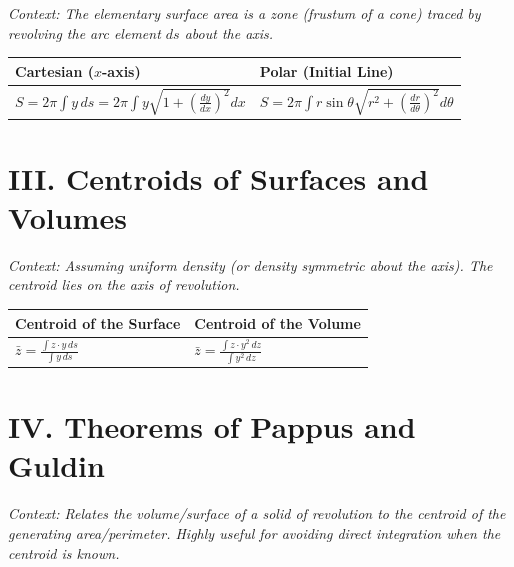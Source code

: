 \documentclass[11pt, a4paper]{article}
\begin{document}
\textit{\small Context: The elementary surface area is a zone (frustum of a cone) traced by revolving the arc element $ds$ about the axis.}

\begin{center}
\begin{tabular}{@{}p{} p{}@{}}
\toprule
\textbf{Cartesian ($x$-axis)} & \textbf{Polar (Initial Line)} \\
\midrule
$S = 2\pi \int y \, ds = 2\pi \int y \sqrt{1 + \left(\frac{dy}{dx}\right)^2} dx$ & $S = 2\pi \int r \sin\theta \sqrt{r^2 + \left(\frac{dr}{d\theta}\right)^2} d\theta$ \\
\bottomrule
\end{tabular}
\end{center}

\vspace{0.3cm}

\section*{\color{primary} III. Centroids of Surfaces and Volumes}

\textit{\small Context: Assuming uniform density (or density symmetric about the axis). The centroid lies on the axis of revolution.}

\begin{center}
\begin{tabular}{@{}p{} p{}@{}}
\toprule
\textbf{Centroid of the Surface} & \textbf{Centroid of the Volume} \\
\midrule
$\bar{z} = \frac{\int z \cdot y \, ds}{\int y \, ds}$ & $\bar{z} = \frac{\int z \cdot y^2 \, dz}{\int y^2 \, dz}$ \\
\bottomrule
\end{tabular}
\end{center}

\vspace{0.3cm}


\section*{\color{primary} IV. Theorems of Pappus and Guldin}

\textit{\small Context: Relates the volume/surface of a solid of revolution to the centroid of the generating area/perimeter. Highly useful for avoiding direct integration when the centroid is known.}
\end{document}
